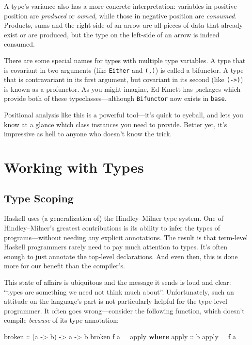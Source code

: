 \documentclass[
  11pt,
]{book}
\newenvironment{Shaded}{}{}
\newcommand{\KeywordTok}[1]{\textcolor[rgb]{0.00,0.44,0.13}{\textbf{#1}}}
\newcommand{\NormalTok}[1]{#1}
\newcommand{\OtherTok}[1]{\textcolor[rgb]{0.00,0.44,0.13}{#1}}
\theoremstyle{nonumberplain}
\begin{document}
A type's variance also has a more concrete interpretation: variables in
positive position are \emph{produced} or \emph{owned}, while those in
negative position are \emph{consumed}. Products, sums and the right-side
of an arrow are all pieces of data that already exist or are produced,
but the type on the left-side of an arrow is indeed consumed.

There are some special names for types with multiple type variables. A
type that is covariant in two arguments (like \texttt{Either} and
\texttt{(,)}) is called a bifunctor. A type that is contravariant in its
first argument, but covariant in its second (like
\texttt{(-\textgreater{})}) is known as a profunctor. As you might
imagine, Ed Kmett has packages which provide both of these
typeclasses---although \texttt{Bifunctor} now exists in \texttt{base}.

Positional analysis like this is a powerful tool---it's quick to
eyeball, and lets you know at a glance which class instances you need to
provide. Better yet, it's impressive as hell to anyone who doesn't know
the trick.

\hypertarget{working-with-types}{%
\chapter{Working with Types}\label{working-with-types}}

\hypertarget{type-scoping}{%
\section{Type Scoping}\label{type-scoping}}

Haskell uses (a generalization of) the Hindley--Milner type system. One
of Hindley--Milner's greatest contributions is its ability to infer the
types of programs---without needing any explicit annotations. The result
is that term-level Haskell programmers rarely need to pay much attention
to types. It's often enough to just annotate the top-level declarations.
And even then, this is done more for our benefit than the compiler's.

This state of affairs is ubiquitous and the message it sends is loud and
clear: ``types are something we need not think much about''.
Unfortunately, such an attitude on the language's part is not
particularly helpful for the type-level programmer. It often goes
wrong---consider the following function, which doesn't compile
\emph{because} of its type annotation:

\begin{Shaded}
\begin{Highlighting}[]
\OtherTok{broken ::}\NormalTok{ (a }\OtherTok{{-}\textgreater{}}\NormalTok{ b) }\OtherTok{{-}\textgreater{}}\NormalTok{ a }\OtherTok{{-}\textgreater{}}\NormalTok{ b}
\NormalTok{broken f a }\OtherTok{=}\NormalTok{ apply}
  \KeywordTok{where}
\OtherTok{    apply ::}\NormalTok{ b}
\NormalTok{    apply }\OtherTok{=}\NormalTok{ f a}
\end{Highlighting}
\end{Shaded}
\end{document}
